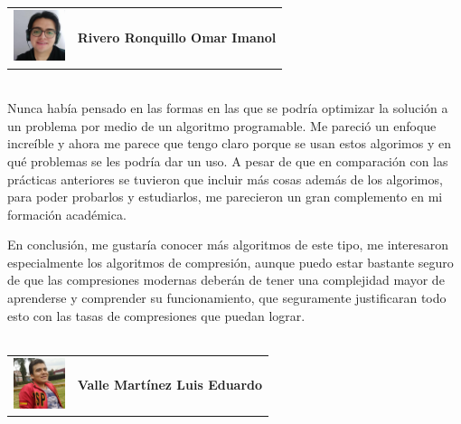 \begin{tabular}{l l}
        \multirow{3}{*}{\includegraphics[width=1.5cm]{Imagenes/imanol.jpg}} &  \\
        & \textbf{Rivero Ronquillo Omar Imanol}\\
        & \\
    \end{tabular}
    \vspace*{3\baselineskip}\\
    Nunca había pensado en las formas en las que se podría optimizar la solución a un problema por medio de un algoritmo programable. Me pareció un enfoque increíble y ahora me parece que tengo claro porque se usan estos algorimos y en qué problemas se les podría dar un uso. A pesar de que en comparación con las prácticas anteriores se tuvieron que incluir más cosas además de los algorimos, para poder probarlos y estudiarlos, me parecieron un gran complemento en mi formación académica.
    
    En conclusión, me gustaría conocer más algoritmos de este tipo, me interesaron especialmente los algoritmos de compresión, aunque puedo estar bastante seguro de que las compresiones modernas deberán de tener una complejidad mayor de aprenderse y comprender su funcionamiento, que seguramente justificaran todo esto con las tasas de compresiones que puedan lograr.
    \\\\
    \begin{tabular}{l l}
        \multirow{3}{*}{\includegraphics[width=1.5cm]{Imagenes/lalo.jpg}}  &  \\
        & \textbf{Valle Mart\'inez Luis Eduardo} \\
        & \\
    \end{tabular}
    \vspace*{3\baselineskip}\\
    